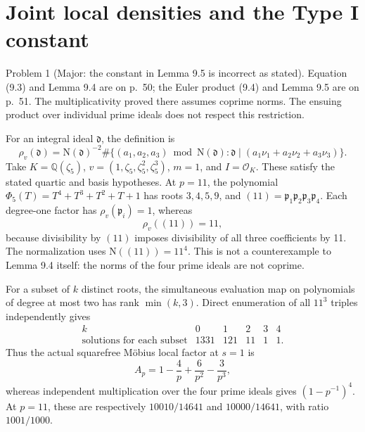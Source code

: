 \documentclass[10pt]{article}
\begin{document}
\section*{Joint local densities and the Type I constant}
Problem 1 (Major: the constant in Lemma 9.5 is incorrect as stated).  Equation (9.3) and Lemma 9.4 are on p. 50; the Euler product (9.4) and Lemma 9.5 are on p. 51. The multiplicativity proved there assumes coprime norms. The ensuing product over individual prime ideals does not respect this restriction.\par
For an integral ideal \(\mathfrak d\), the definition is \[\rho_v(\mathfrak d)=\mathrm N(\mathfrak d)^{-2}
 \#\{(a_1,a_2,a_3)\bmod\mathrm N(\mathfrak d):
 \mathfrak d\mid(a_1\nu_1+a_2\nu_2+a_3\nu_3)\}.\] Take \(K=\mathbb Q(\zeta_5)\), \(v=(1,\zeta_5,\zeta_5^2,\zeta_5^3)\), \(m=1\), and \(I=\mathcal O_K\). These satisfy the stated quartic and basis hypotheses. At \(p=11\), the polynomial \(\Phi_5(T)=T^4+T^3+T^2+T+1\) has roots \(3,4,5,9\), and \((11)=\mathfrak p_1\mathfrak p_2\mathfrak p_3\mathfrak p_4\). Each degree-one factor has \(\rho_v(\mathfrak p_i)=1\), whereas \[\rho_v((11))=11,\] because divisibility by \((11)\) imposes divisibility of all three coefficients by 11. The normalization uses \(\mathrm N((11))=11^4\). This is not a counterexample to Lemma 9.4 itself: the norms of the four prime ideals are not coprime.\par
For a subset of \(k\) distinct roots, the simultaneous evaluation map on polynomials of degree at most two has rank \(\min(k,3)\). Direct enumeration of all \(11^3\) triples independently gives \[\begin{array}{c|rrrrr}
 k&0&1&2&3&4\\ \hline
 \text{solutions for each subset}&1331&121&11&1&1.
\end{array}\] Thus the actual squarefree Möbius local factor at \(s=1\) is \[A_p=1-\frac4p+\frac6{p^2}-\frac3{p^3},\] whereas independent multiplication over the four prime ideals gives \((1-p^{-1})^4\). At \(p=11\), these are respectively \(10010/14641\) and \(10000/14641\), with ratio \(1001/1000\).\par
\end{document}
